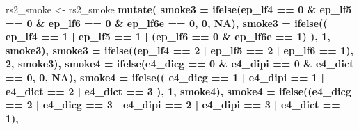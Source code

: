 \documentclass[]{book}
\newenvironment{Shaded}{\begin{snugshade}}{\end{snugshade}}
\newcommand{\DataTypeTok}[1]{\textcolor[rgb]{0.13,0.29,0.53}{#1}}
\newcommand{\DecValTok}[1]{\textcolor[rgb]{0.00,0.00,0.81}{#1}}
\newcommand{\KeywordTok}[1]{\textcolor[rgb]{0.13,0.29,0.53}{\textbf{#1}}}
\newcommand{\NormalTok}[1]{#1}
\newcommand{\OperatorTok}[1]{\textcolor[rgb]{0.81,0.36,0.00}{\textbf{#1}}}
\newcommand{\OtherTok}[1]{\textcolor[rgb]{0.56,0.35,0.01}{#1}}
\newcommand{\StringTok}[1]{\textcolor[rgb]{0.31,0.60,0.02}{#1}}
\begin{document}
\begin{Shaded}
\begin{Highlighting}[]
{{\NormalTok{rs2_smoke <-}\StringTok{ }\NormalTok{rs2_smoke }\OperatorTok{%
\StringTok{  }\KeywordTok{mutate}\NormalTok{(}
    \DataTypeTok{smoke3 =} \KeywordTok{ifelse}\NormalTok{(ep_lf4 }\OperatorTok{==}\StringTok{ }\DecValTok{0} \OperatorTok{&}
\StringTok{                      }\NormalTok{ep_lf5 }\OperatorTok{==}\StringTok{ }\DecValTok{0} \OperatorTok{&}\StringTok{ }\NormalTok{ep_lf6 }\OperatorTok{==}\StringTok{ }\DecValTok{0} \OperatorTok{&}\StringTok{ }\NormalTok{ep_lf6e }\OperatorTok{==}\StringTok{ }\DecValTok{0}\NormalTok{, }\DecValTok{0}\NormalTok{, }\OtherTok{NA}\NormalTok{),}
    \DataTypeTok{smoke3 =} \KeywordTok{ifelse}\NormalTok{((}
\NormalTok{      ep_lf4 }\OperatorTok{==}\StringTok{ }\DecValTok{1} \OperatorTok{|}
\StringTok{        }\NormalTok{ep_lf5 }\OperatorTok{==}\StringTok{ }\DecValTok{1} \OperatorTok{|}\StringTok{ }\NormalTok{(ep_lf6 }\OperatorTok{==}\StringTok{ }\DecValTok{0} \OperatorTok{&}\StringTok{ }\NormalTok{ep_lf6e }\OperatorTok{==}\StringTok{ }\DecValTok{1}\NormalTok{)}
\NormalTok{    ), }\DecValTok{1}\NormalTok{, smoke3),}
    \DataTypeTok{smoke3 =} \KeywordTok{ifelse}\NormalTok{((ep_lf4 }\OperatorTok{==}\StringTok{ }\DecValTok{2} \OperatorTok{|}
\StringTok{                       }\NormalTok{ep_lf5 }\OperatorTok{==}\StringTok{ }\DecValTok{2} \OperatorTok{|}\StringTok{ }\NormalTok{ep_lf6 }\OperatorTok{==}\StringTok{ }\DecValTok{1}\NormalTok{), }\DecValTok{2}\NormalTok{, smoke3),}
    \DataTypeTok{smoke4 =} \KeywordTok{ifelse}\NormalTok{(e4_dicg }\OperatorTok{==}\StringTok{ }\DecValTok{0} \OperatorTok{&}
\StringTok{                      }\NormalTok{e4_dipi }\OperatorTok{==}\StringTok{ }\DecValTok{0} \OperatorTok{&}\StringTok{ }\NormalTok{e4_dict }\OperatorTok{==}\StringTok{ }\DecValTok{0}\NormalTok{, }\DecValTok{0}\NormalTok{, }\OtherTok{NA}\NormalTok{),}
    \DataTypeTok{smoke4 =} \KeywordTok{ifelse}\NormalTok{((}
\NormalTok{      e4_dicg }\OperatorTok{==}\StringTok{ }\DecValTok{1} \OperatorTok{|}
\StringTok{        }\NormalTok{e4_dipi }\OperatorTok{==}\StringTok{ }\DecValTok{1} \OperatorTok{|}\StringTok{ }\NormalTok{e4_dict }\OperatorTok{==}\StringTok{ }\DecValTok{2} \OperatorTok{|}\StringTok{ }\NormalTok{e4_dict }\OperatorTok{==}\StringTok{ }\DecValTok{3}
\NormalTok{    ), }\DecValTok{1}\NormalTok{, smoke4),}
    \DataTypeTok{smoke4 =} \KeywordTok{ifelse}\NormalTok{((e4_dicg }\OperatorTok{==}\StringTok{ }\DecValTok{2} \OperatorTok{|}
\StringTok{                       }\NormalTok{e4_dicg }\OperatorTok{==}\StringTok{ }\DecValTok{3} \OperatorTok{|}
\StringTok{                       }\NormalTok{e4_dipi }\OperatorTok{==}\StringTok{ }\DecValTok{2} \OperatorTok{|}\StringTok{ }\NormalTok{e4_dipi }\OperatorTok{==}\StringTok{ }\DecValTok{3} \OperatorTok{|}\StringTok{ }\NormalTok{e4_dict }\OperatorTok{==}\StringTok{ }\DecValTok{1}\NormalTok{),}
}}}
\end{Highlighting}
\end{Shaded}
\end{document}
